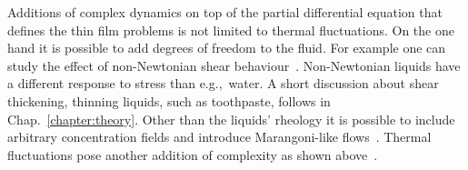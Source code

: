 Additions of complex dynamics on top of the partial differential equation that defines the thin film problems is not limited to thermal fluctuations.
On the one hand it is possible to add degrees of freedom to the fluid. 
For example one can study the effect of non-Newtonian shear behaviour~\cite{zhangNonNewtonianEffectsLubricant2005, myersApplicationNonNewtonianModels2005}. 
Non-Newtonian liquids have a different response to stress than e.g.,~water. 
A short discussion about shear thickening, thinning liquids, such as toothpaste, follows in Chap.~\ref{chapter:theory}.
Other than the liquids' rheology it is possible to include arbitrary concentration fields and introduce Marangoni-like flows~\cite{sultanEvaporationThinFilm2005, hermansLungSurfactantsDifferent2015, surSteadyProfileFingeringFlows2004}.
Thermal fluctuations pose another addition of complexity as shown above~\cite{grunThinFilmFlowInfluenced2006, meckeThermalFluctuationsThin2005, davidovitchSpreadingViscousFluid2005, zitzLatticeBoltzmannSimulations2021}.

